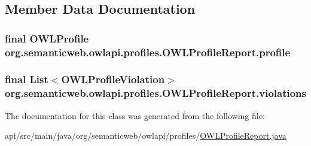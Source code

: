 \subsection{Member Data Documentation}
\hypertarget{classorg_1_1semanticweb_1_1owlapi_1_1profiles_1_1_o_w_l_profile_report_afa83cbee66be572072c3ebdcb986b684}{
\subsubsection[{profile}]{\setlength{\rightskip}{0pt plus 5cm}final {\bf O\-W\-L\-Profile} org.\-semanticweb.\-owlapi.\-profiles.\-O\-W\-L\-Profile\-Report.\-profile\hspace{0.3cm}{\ttfamily [private]}}}\label{classorg_1_1semanticweb_1_1owlapi_1_1profiles_1_1_o_w_l_profile_report_afa83cbee66be572072c3ebdcb986b684}
\hypertarget{classorg_1_1semanticweb_1_1owlapi_1_1profiles_1_1_o_w_l_profile_report_aa978b06f5c4f414bf77f5690ec071faf}{
\subsubsection[{violations}]{\setlength{\rightskip}{0pt plus 5cm}final List$<${\bf O\-W\-L\-Profile\-Violation}$>$ org.\-semanticweb.\-owlapi.\-profiles.\-O\-W\-L\-Profile\-Report.\-violations\hspace{0.3cm}{\ttfamily [private]}}}\label{classorg_1_1semanticweb_1_1owlapi_1_1profiles_1_1_o_w_l_profile_report_aa978b06f5c4f414bf77f5690ec071faf}


The documentation for this class was generated from the following file\-:\begin{DoxyCompactItemize}
\item 
api/src/main/java/org/semanticweb/owlapi/profiles/\hyperlink{_o_w_l_profile_report_8java}{O\-W\-L\-Profile\-Report.\-java}\end{DoxyCompactItemize}
